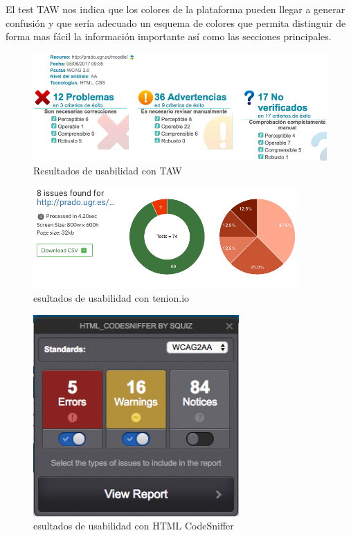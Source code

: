 \bigskip
El test TAW nos indica que los colores de la plataforma pueden llegar a generar confusión y que sería adecuado un esquema de colores que permita distinguir de forma mas fácil la información importante así como las secciones principales.

\begin{figure}[H]
\centering
\includegraphics[width=1.0\textwidth]{../screenshots/tawdis}
\caption{Resultados de usabilidad con TAW}
\label{fig:tawdis}
\end{figure}

\begin{figure}[H]
\centering
\includegraphics[width=0.9\textwidth]{../screenshots/tenon}
\caption{esultados de usabilidad con tenion.io}
\label{fig:tenon}
\end{figure}

\begin{figure}[H]
\centering
\includegraphics[width=0.7\textwidth]{../screenshots/htmlcodesniffer}
\caption{esultados de usabilidad con HTML CodeSniffer}
\label{fig:htmlcodesniffer}
\end{figure}


